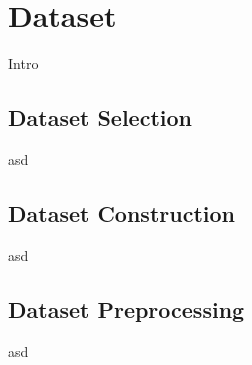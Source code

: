 \section{Dataset}

Intro


\subsection{Dataset Selection}
asd

\subsection{Dataset Construction}
asd

\subsection{Dataset Preprocessing}
asd

